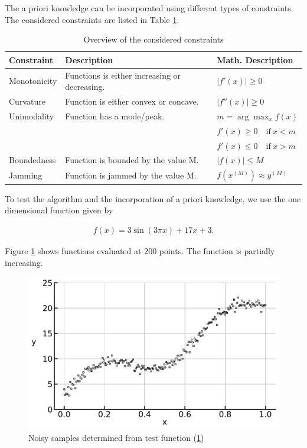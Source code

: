 \documentclass[10pt,a4paper]{report}
\begin{document}
The a priori knowledge can be incorporated using different types of constraints. The considered constraints are listed in Table \ref{tab:constraint_overview}.

\begin{table}[h]
	\centering
	\begin{tabular}{|lll|}
		\hline
		\textbf{Constraint}& \textbf{Description}                         & \textbf{Math. Description}\\ \hline \toprule
		Monotonicity       & Functions is either increasing or decreasing.& $\lvert f'(x) \rvert \ge 0$ 	\\ \hline
		Curvature          & Function is either convex or concave.        & $\lvert f''(x) \rvert \ge 0$ 	\\ \hline
		Unimodality        & Function has a mode/peak.                    & $m = \arg \max_{x} f(x)$ 				\\ 
		&	   										  & $f'(x) \ge 0 \quad \text{if} \ x < m$  \\ 
		&  											  & $f'(x) \le 0 \quad \text{if} \ x > m$  \\ \hline
		Boundedness        & Function is bounded by the value M.          & $\lvert f(x)\rvert \le M$ 		\\ \hline
		Jamming            & Function is jammed by the value M.           & $f(x^{(M)}) \approx y^{(M)}$	\\ \hline \bottomrule
	\end{tabular}
	\caption{Overview of the considered constraints}
	\label{tab:constraint_overview}
\end{table}

To test the algorithm and the incorporation of a priori knowledge, we use the one dimensional function given by 

\begin{align}\label{eq:test_func}
	f(x) = 3\sin(3\pi x) + 17x + 3.
\end{align}

Figure \ref{fig:test_func} shows functions evaluated at 200 points. The function is partially increasing.  

\begin{figure}[H]
	\centering
	\includegraphics[width=\columnwidth]{../thesisplots/test_func.pdf}
	\caption{Noisy samples determined from test function (\ref{fig:test_func})}
	\label{fig:test_func}
\end{figure}
\end{document}
